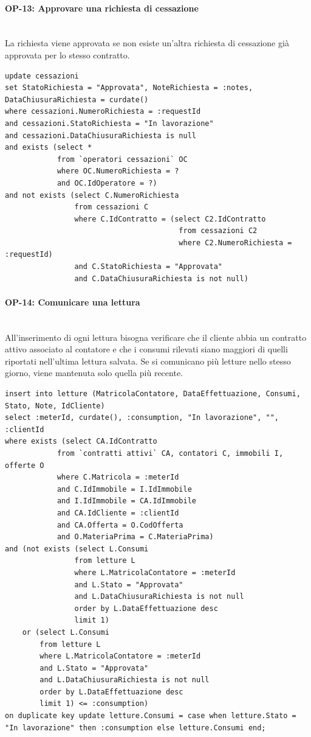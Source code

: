 \documentclass[a4paper,12pt]{report}
\begin{document}
\paragraph{OP-13: Approvare una richiesta di cessazione}\mbox{}\\
La richiesta viene approvata se non esiste un'altra richiesta di cessazione già approvata per lo stesso contratto.
\begin{lstlisting}
update cessazioni
set StatoRichiesta = "Approvata", NoteRichiesta = :notes, DataChiusuraRichiesta = curdate()
where cessazioni.NumeroRichiesta = :requestId
and cessazioni.StatoRichiesta = "In lavorazione"
and cessazioni.DataChiusuraRichiesta is null
and exists (select *
            from `operatori cessazioni` OC
            where OC.NumeroRichiesta = ?
            and OC.IdOperatore = ?)
and not exists (select C.NumeroRichiesta
                from cessazioni C
                where C.IdContratto = (select C2.IdContratto
                                        from cessazioni C2
                                        where C2.NumeroRichiesta = :requestId)
                and C.StatoRichiesta = "Approvata"
                and C.DataChiusuraRichiesta is not null)
\end{lstlisting}

\paragraph{OP-14: Comunicare una lettura}\mbox{}\\
All'inserimento di ogni lettura bisogna verificare che il cliente abbia un contratto attivo associato al contatore e che i consumi rilevati siano maggiori di quelli riportati nell'ultima lettura salvata. Se si comunicano più letture nello stesso giorno, viene mantenuta solo quella più recente.
\begin{lstlisting}
insert into letture (MatricolaContatore, DataEffettuazione, Consumi, Stato, Note, IdCliente)
select :meterId, curdate(), :consumption, "In lavorazione", "", :clientId
where exists (select CA.IdContratto
            from `contratti attivi` CA, contatori C, immobili I, offerte O
            where C.Matricola = :meterId
            and C.IdImmobile = I.IdImmobile
            and I.IdImmobile = CA.IdImmobile
            and CA.IdCliente = :clientId
            and CA.Offerta = O.CodOfferta
            and O.MateriaPrima = C.MateriaPrima)
and (not exists (select L.Consumi
                from letture L
                where L.MatricolaContatore = :meterId
                and L.Stato = "Approvata"
                and L.DataChiusuraRichiesta is not null
                order by L.DataEffettuazione desc
                limit 1)
    or (select L.Consumi
        from letture L
        where L.MatricolaContatore = :meterId
        and L.Stato = "Approvata"
        and L.DataChiusuraRichiesta is not null
        order by L.DataEffettuazione desc
        limit 1) <= :consumption)
on duplicate key update letture.Consumi = case when letture.Stato = "In lavorazione" then :consumption else letture.Consumi end;
\end{lstlisting}
\end{document}
